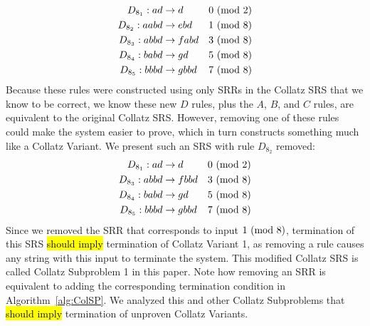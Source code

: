 \begin{align*}
    D_{8_1}: ad &\rightarrow d &\text{$0\ (\mathrm{mod}\ 2)$}\\
    D_{8_2}: aabd &\rightarrow ebd &\text{$1\ (\mathrm{mod}\ 8)$}\\
    D_{8_3}: abbd &\rightarrow fabd &\text{$3\ (\mathrm{mod}\ 8)$}\\
    D_{8_4}: babd &\rightarrow gd &\text{$5\ (\mathrm{mod}\ 8)$}\\
    D_{8_5}: bbbd &\rightarrow gbbd &\text{$7\ (\mathrm{mod}\ 8)$}
\end{align*}
Because these rules were constructed using only SRRs in the Collatz SRS that we know to be correct, we know these new $D$ rules, plus the $A$, $B$, and $C$ rules, are equivalent to the original Collatz SRS. However, removing one of these rules could make the system easier to prove, which in turn constructs something much like a Collatz Variant. We present such an SRS with rule $D_{8_2}$ removed:
\begin{align*}
    D_{8_1}: ad &\rightarrow d &\text{$0\ (\mathrm{mod}\ 2)$}\\
    D_{8_3}: abbd &\rightarrow fbbd &\text{$3\ (\mathrm{mod}\ 8)$}\\
    D_{8_4}: babd &\rightarrow gd &\text{$5\ (\mathrm{mod}\ 8)$}\\
    D_{8_5}: bbbd &\rightarrow gbbd &\text{$7\ (\mathrm{mod}\ 8)$}
\end{align*}
Since we removed the SRR that corresponds to input $1 \ (\mathrm{mod}\ 8)$, termination of this SRS \hl{should imply} termination of Collatz Variant 1, as removing a rule causes any string with this input to terminate the system. This modified Collatz SRS is called Collatz Subproblem 1 in this paper. Note how removing an SRR is equivalent to adding the corresponding termination condition in Algorithm~\ref{alg:ColSP}.  We analyzed this and other Collatz Subproblems that \hl{should imply} termination of unproven Collatz Variants.\par
